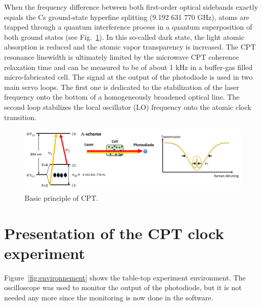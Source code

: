 \documentclass[a4paper,11pt]{article}
\begin{document}
When the frequency difference between both first-order optical sidebands exactly equals the Cs ground-state hyperfine splitting (9.192 631 770 GHz), atoms are trapped through a quantum interference process in a quantum superposition of both ground states (see Fig.~\ref{fig:ppeCPT}). In this so-called dark state, the light atomic absorption is reduced and the atomic vapor transparency is increased. The CPT resonance linewidth is ultimately limited by the microwave CPT coherence relaxation time and can be measured to be of about 1 kHz in a buffer-gas filled micro-fabricated cell. The signal at the output of the photodiode is used in two main servo loops. The first one is dedicated to the stabilization of the laser frequency onto the bottom of a homogeneously broadened optical line. The second loop stabilizes the local oscillator (LO) frequency onto the atomic clock transition.

\begin{figure}[h!]
	\centering
	\includegraphics[width=0.9\linewidth]{ppeCPT}
	\caption{Basic principle of CPT.}
	\label{fig:ppeCPT}
\end{figure}


\section{Presentation of the CPT clock experiment}
Figure~\ref{fig:environnement} shows the table-top experiment environment. The oscilloscope was used to monitor the output of the photodiode, but it is not needed any more since the monitoring is now done in the software.
\end{document}
